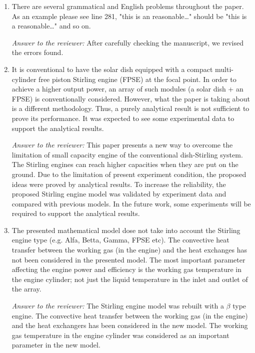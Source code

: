 \documentclass[12pt]{letter}
\begin{document}
\begin{enumerate}
\item There are several grammatical and English problems throughout the paper. As an example please see line 281, "this is an reasonable…" should be "this is a reasonable…" and so on.

\begin{snugshade*}
\emph{Answer to the reviewer:} 
After carefully checking the manuscript, we revised the errors found.
\end{snugshade*}

\item It is conventional to have the solar dish equipped with a compact multi-cylinder free piston Stirling engine (FPSE) at the focal point. In order to achieve a higher output power, an array of such modules (a solar dish + an FPSE) is conventionally considered. However, what the paper is taking about is a different methodology. Thus, a purely analytical result is not sufficient to prove its performance. It was expected to see some experimental data to support the analytical results.

\begin{snugshade*}
\emph{Answer to the reviewer:} 
This paper presents a new way to overcome the limitation of small capacity engine of the conventional dish-Stirling system. The Stirling engines can reach higher capacities when they are put on the ground. Due to the limitation of present experiment condition, the proposed ideas were proved by analytical results. To increase the reliability, the proposed Stirling engine model was validated by experiment data and compared with previous models. In the future work, some experiments will be required to support the analytical results.
\end{snugshade*}

\item The presented mathematical model dose not take into account the Stirling engine type (e.g. Alfa, Betta, Gamma, FPSE etc). The convective heat transfer between the working gas (in the engine) and the heat exchanges has not been considered in the presented model. The most important parameter affecting the engine power and efficiency is the working gas temperature in the engine cylinder; not just the liquid temperature in the inlet and outlet of the array.

\begin{snugshade*}
\emph{Answer to the reviewer:} 
The Stirling engine model was rebuilt with a $\beta$ type engine. The convective heat transfer between the working gas (in the engine) and the heat exchangers has been considered in the new model. The working gas temperature in the engine cylinder was considered as an important parameter in the new model.
\end{snugshade*}


\end{enumerate}
\end{document}
